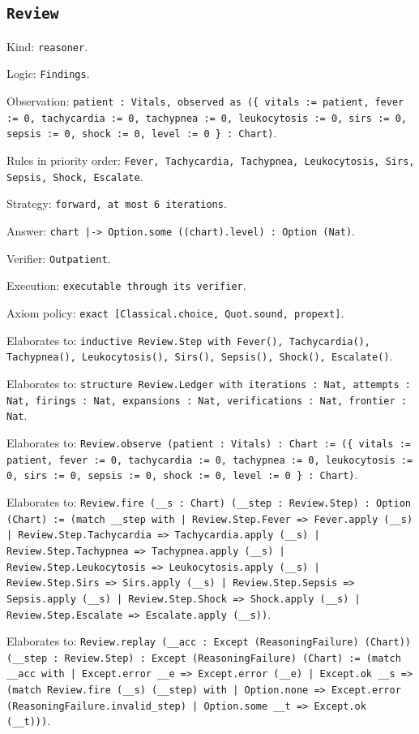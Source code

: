 \documentclass[11pt]{article}
\begin{document}
\subsection*{\texttt{Review}}
\noindent Kind: \texttt{reasoner}.\par
\noindent Logic: \texttt{Findings}.\par
\noindent Observation: \texttt{patient : Vitals, observed as (\{ vitals := patient, fever := 0, tachycardia := 0, tachypnea := 0, leukocytosis := 0, sirs := 0, sepsis := 0, shock := 0, level := 0 \} : Chart)}.\par
\noindent Rules in priority order: \texttt{Fever, Tachycardia, Tachypnea, Leukocytosis, Sirs, Sepsis, Shock, Escalate}.\par
\noindent Strategy: \texttt{forward, at most 6 iterations}.\par
\noindent Answer: \texttt{chart |-> Option.some ((chart).level) : Option (Nat)}.\par
\noindent Verifier: \texttt{Outpatient}.\par
\noindent Execution: \texttt{executable through its verifier}.\par
\noindent Axiom policy: \texttt{exact [Classical.choice, Quot.sound, propext]}.\par
\noindent Elaborates to: \texttt{inductive Review.Step with Fever(), Tachycardia(), Tachypnea(), Leukocytosis(), Sirs(), Sepsis(), Shock(), Escalate()}.\par
\noindent Elaborates to: \texttt{structure Review.Ledger with iterations : Nat, attempts : Nat, firings : Nat, expansions : Nat, verifications : Nat, frontier : Nat}.\par
\noindent Elaborates to: \texttt{Review.observe (patient : Vitals) : Chart := (\{ vitals := patient, fever := 0, tachycardia := 0, tachypnea := 0, leukocytosis := 0, sirs := 0, sepsis := 0, shock := 0, level := 0 \} : Chart)}.\par
\noindent Elaborates to: \texttt{Review.fire (\_\_s : Chart) (\_\_step : Review.Step) : Option (Chart) := (match \_\_step with | Review.Step.Fever => Fever.apply (\_\_s) | Review.Step.Tachycardia => Tachycardia.apply (\_\_s) | Review.Step.Tachypnea => Tachypnea.apply (\_\_s) | Review.Step.Leukocytosis => Leukocytosis.apply (\_\_s) | Review.Step.Sirs => Sirs.apply (\_\_s) | Review.Step.Sepsis => Sepsis.apply (\_\_s) | Review.Step.Shock => Shock.apply (\_\_s) | Review.Step.Escalate => Escalate.apply (\_\_s))}.\par
\noindent Elaborates to: \texttt{Review.replay (\_\_acc : Except (ReasoningFailure) (Chart)) (\_\_step : Review.Step) : Except (ReasoningFailure) (Chart) := (match \_\_acc with | Except.error \_\_e => Except.error (\_\_e) | Except.ok \_\_s => (match Review.fire (\_\_s) (\_\_step) with | Option.none => Except.error (ReasoningFailure.invalid\_step) | Option.some \_\_t => Except.ok (\_\_t)))}.\par
\end{document}
